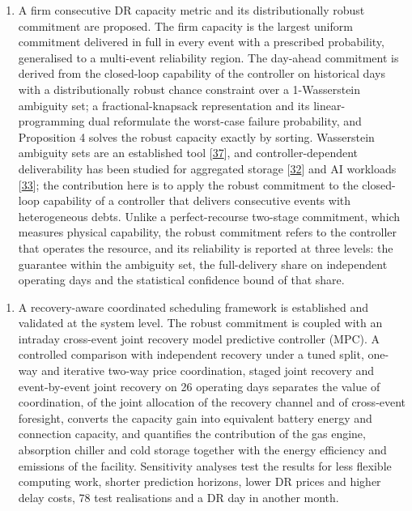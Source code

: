 \documentclass[a4paper,twocolumn,fleqn,10pt]{article}
\providecommand{\tightlist}{\setlength{\itemsep}{0pt}\setlength{\parskip}{0pt}}
\begin{document}
\begin{enumerate}
\def\labelenumi{(\arabic{enumi})}
\setcounter{enumi}{1}
\tightlist
\item
  A firm consecutive DR capacity metric and its distributionally robust commitment are proposed. The firm capacity is the largest uniform commitment delivered in full in every event with a prescribed probability, generalised to a multi-event reliability region. The day-ahead commitment is derived from the closed-loop capability of the controller on historical days with a distributionally robust chance constraint over a 1-Wasserstein ambiguity set; a fractional-knapsack representation and its linear-programming dual reformulate the worst-case failure probability, and Proposition 4 solves the robust capacity exactly by sorting. Wasserstein ambiguity sets are an established tool [\hyperlink{ref37}{37}], and controller-dependent deliverability has been studied for aggregated storage [\hyperlink{ref32}{32}] and AI workloads [\hyperlink{ref33}{33}]; the contribution here is to apply the robust commitment to the closed-loop capability of a controller that delivers consecutive events with heterogeneous debts. Unlike a perfect-recourse two-stage commitment, which measures physical capability, the robust commitment refers to the controller that operates the resource, and its reliability is reported at three levels: the guarantee within the ambiguity set, the full-delivery share on independent operating days and the statistical confidence bound of that share.
\end{enumerate}

\begin{enumerate}
\def\labelenumi{(\arabic{enumi})}
\setcounter{enumi}{2}
\tightlist
\item
  A recovery-aware coordinated scheduling framework is established and validated at the system level. The robust commitment is coupled with an intraday cross-event joint recovery model predictive controller (MPC). A controlled comparison with independent recovery under a tuned split, one-way and iterative two-way price coordination, staged joint recovery and event-by-event joint recovery on 26 operating days separates the value of coordination, of the joint allocation of the recovery channel and of cross-event foresight, converts the capacity gain into equivalent battery energy and connection capacity, and quantifies the contribution of the gas engine, absorption chiller and cold storage together with the energy efficiency and emissions of the facility. Sensitivity analyses test the results for less flexible computing work, shorter prediction horizons, lower DR prices and higher delay costs, 78 test realisations and a DR day in another month.
\end{enumerate}
\end{document}
